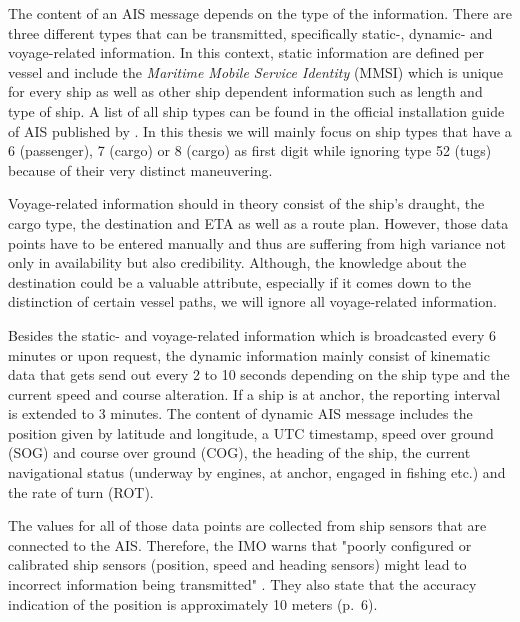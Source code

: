 The content of an AIS message depends on the type of the information. There are three different types that can be transmitted, specifically static-, dynamic- and voyage-related information. In this context, static information are defined per vessel and include the \textit{Maritime Mobile Service Identity} (MMSI) which is unique for every ship as well as other ship dependent information such as length and type of ship. A list of all ship types can be found in the official installation guide of AIS published by \cite{imo2}. In this thesis we will mainly focus on ship types that have a 6 (passenger), 7 (cargo) or 8 (cargo) as first digit while ignoring type 52 (tugs) because of their very distinct maneuvering.
\par
Voyage-related information should in theory consist of the ship's draught, the cargo type, the destination and ETA as well as a route plan. However, those data points have to be entered manually and thus are suffering from high variance not only in availability but also credibility. Although, the knowledge about the destination could be a valuable attribute, especially if it comes down to the distinction of certain vessel paths, we will ignore all voyage-related information.
\par
Besides the static- and voyage-related information which is broadcasted every 6 minutes or upon request, the dynamic information mainly consist of kinematic data that gets send out every 2 to 10 seconds depending on the ship type and the current speed and course alteration. If a ship is at anchor, the reporting interval is extended to 3 minutes. The content of dynamic AIS message includes the position given by latitude and longitude, a UTC timestamp, speed over ground (SOG) and course over ground (COG), the heading of the ship, the current navigational status (underway by engines, at anchor, engaged in fishing etc.) and the rate of turn (ROT). 
\par
The values for all of those data points are collected from ship sensors that are connected to the AIS. Therefore, the IMO warns that "poorly configured or calibrated ship sensors (position,
speed and heading sensors) might lead to incorrect information being transmitted" \cite[p.~11]{international2015revised}. They also state that the accuracy indication of the position is approximately 10 meters (p.~6).